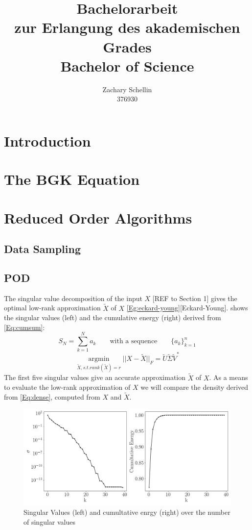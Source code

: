 \documentclass[12pt, a4paper]{article}
\begin{document}
\title{Bachelorarbeit\\ zur Erlangung des akademischen Grades\\ Bachelor of Science}
\author{Zachary Schellin\\376930}
\maketitle
\tableofcontents
\section{Introduction}

\section{The BGK Equation}
\section{Reduced Order Algorithms}
\subsection{Data Sampling}
\subsection{POD}
The singular value decomposition of the input $X$ [REF to Section 1] gives the optimal low-rank approximation $\tilde{X}$ of $X$ \cref{Eg:eckard-young}[Eckard-Young].  shows the singular values (left) and the cumulative energy (right) derived from \cref{Eq:cumsum}:
\begin{equation}
S_N = \sum_{k=1}^{N}a_k \qquad\textrm{with a sequence} \qquad\{a_k\}_{k=1}^{n} 
\label{Eq:cumsum}
\end{equation}
\begin{equation}
\underset{\tilde{X}, s.t. rank(\tilde{X})=r}{\operatorname{argmin}} || X -\tilde{X} ||_F=\tilde{U}\tilde{\Sigma}\tilde{V}^*
\label{Eg:eckard-young}
\end{equation}
The first five singular values give an accurate approximation $\tilde{X}$ of $X$.  
As a means to evaluate the low-rank approximation of $X$ we will compare the density derived from \cref{Eq:dense}, computed from $X$ and $\tilde{X}$.
\begin{figure}[htb!]
	\centering
	\includegraphics[width=\textwidth]{Figures/Cumultative_Singular_Values_kn001.png}
	\caption{Singular Values (left) and cumultative enrgy (right) over the number of singular values}
	\label{Fig:cumu_sing}
\end{figure}
\end{document}
